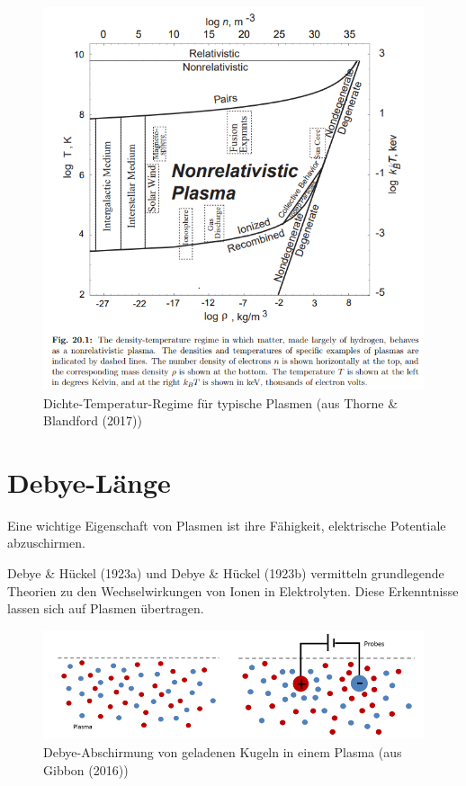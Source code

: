 \documentclass[
  a4paper,
  DIV=11]{scrreprt}
\begin{document}
\begin{figure}

{\centering \includegraphics{./images/paste-B4955853.png}

}

\caption{\label{fig-typical-plasma}Dichte-Temperatur-Regime für typische
Plasmen (aus Thorne \& Blandford (2017))}

\end{figure}

\hypertarget{debye-luxe4nge}{%
\section{Debye-Länge}\label{debye-luxe4nge}}

Eine wichtige Eigenschaft von Plasmen ist ihre Fähigkeit, elektrische
Potentiale abzuschirmen.

Debye \& Hückel (1923a) und Debye \& Hückel (1923b) vermitteln
grundlegende Theorien zu den Wechselwirkungen von Ionen in Elektrolyten.
Diese Erkenntnisse lassen sich auf Plasmen übertragen.

\begin{figure}

{\centering \includegraphics[width=5.83333in,height=\textheight]{./images/paste-718770F4.png}

}

\caption{\label{fig-elektrolyt}Debye-Abschirmung von geladenen Kugeln in
einem Plasma (aus Gibbon (2016))}

\end{figure}
\end{document}

